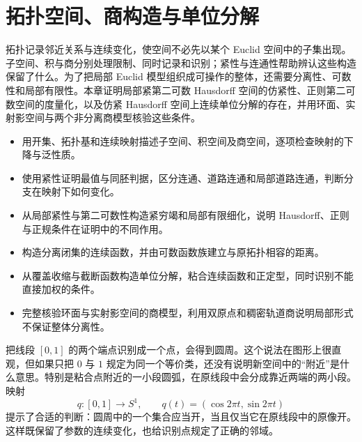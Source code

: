 
% 
% 

\chapter{拓扑空间、商构造与单位分解}
\label{g1:ch:04}

\begin{chapterabstract}
	拓扑记录邻近关系与连续变化，使空间不必先以某个 Euclid 空间中的子集出现。子空间、积与商分别处理限制、同时记录和识别；紧性与连通性帮助辨认这些构造保留了什么。为了把局部 Euclid 模型组织成可操作的整体，还需要分离性、可数性和局部有限性。本章证明局部紧第二可数 Hausdorff 空间的仿紧性、正则第二可数空间的度量化，以及仿紧 Hausdorff 空间上连续单位分解的存在，并用环面、实射影空间与两个非分离商模型核验这些条件。
\end{chapterabstract}

\begin{learninggoals}
	\begin{itemize}
		\item 用开集、拓扑基和连续映射描述子空间、积空间及商空间，逐项检查映射的下降与泛性质。
		\item 使用紧性证明最值与同胚判据，区分连通、道路连通和局部道路连通，判断分支在映射下如何变化。
		\item 从局部紧性与第二可数性构造紧穷竭和局部有限细化，说明 Hausdorff、正则与正规条件在证明中的不同作用。
		\item 构造分离闭集的连续函数，并由可数函数族建立与原拓扑相容的距离。
		\item 从覆盖收缩与截断函数构造单位分解，粘合连续函数和正定型，同时识别不能直接加权的条件。
		\item 完整核验环面与实射影空间的商模型，利用双原点和稠密轨道商说明局部形式不保证整体分离性。
	\end{itemize}
\end{learninggoals}

把线段 \([0,1]\) 的两个端点识别成一个点，会得到圆周。这个说法在图形上很直观，但如果只把 \(0\) 与 \(1\) 规定为同一个等价类，还没有说明新空间中的“附近”是什么意思。特别是粘合点附近的一小段圆弧，在原线段中会分成靠近两端的两小段。映射
\[
	q:[0,1]\longrightarrow S^1,\qquad q(t)=(\cos2\pi t,\sin2\pi t)
\]
提示了合适的判断：圆周中的一个集合应当开，当且仅当它在原线段中的原像开。这样既保留了参数的连续变化，也给识别点规定了正确的邻域。

